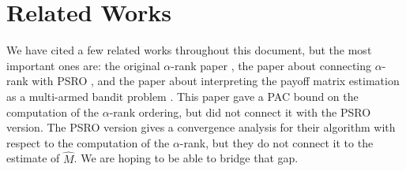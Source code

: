\documentclass{article}
\begin{document}
\section{Related Works}
We have cited a few related works throughout this document, but the most
important ones are: the original $\alpha$-rank paper \cite{alpha}, the paper about
connecting $\alpha$-rank with PSRO \cite{alphaPSRO}, and the paper about
interpreting the payoff matrix estimation as a multi-armed bandit problem
\cite{goodone}. This paper gave a PAC bound on the computation of the
$\alpha$-rank ordering, but did not connect it with the PSRO version. The PSRO
version gives a convergence analysis for their algorithm with respect to the
computation of the $\alpha$-rank, but they do not connect it to the estimate of
$\hat{M}$. We are hoping to be able to bridge that gap.





\end{document}
